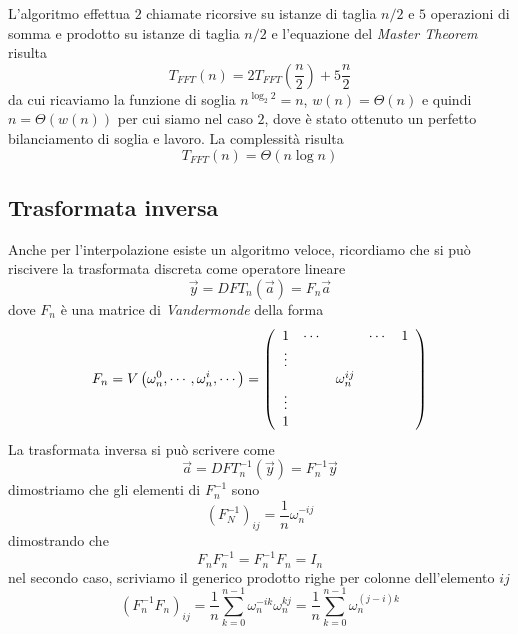 L'algoritmo effettua $2$ chiamate ricorsive su istanze di taglia $n/2$ e $5$ operazioni di somma e prodotto su istanze di taglia $n/2$ e l'equazione del \textit{Master Theorem} risulta
\begin{equation*}
    T_{FFT} (n) = 2 T_{FFT} \left( \frac{n}{2} \right) + 5 \frac{n}{2} %
\end{equation*}
da cui ricaviamo la funzione di soglia $n^{\log_2 2} = n$, $w(n)= \Theta \left( n \right)$ e quindi $n = \Theta \left( w\left( n \right) \right)$ per cui siamo nel caso $2$, dove è stato ottenuto un perfetto bilanciamento di soglia e lavoro. La complessità risulta
\begin{equation*}
    T_{FFT} (n) = \Theta \left( n \log n \right)
\end{equation*}

\subsection{Trasformata inversa}
Anche per l'interpolazione esiste un algoritmo veloce, ricordiamo che si può riscivere la trasformata discreta come operatore lineare 
$$\vec{y} = DFT_n \left( \vec{a} \right) = F_n \vec{a}$$
dove $F_n$ è una matrice di \textit{Vandermonde} della forma
\begin{equation*}
    F_n = V\left( \omega_n^0, \cdots, \omega_n^i, \cdots \right) =
    \left(
        \begin{array}[h]{ccccc}
            1 & \cdots & & \cdots & 1 \\
            \vdots \\
            & & \omega_n^{ij} \\
            \vdots \\
            1\\
        \end{array}
    \right)
\end{equation*}
La trasformata inversa si può scrivere come 
$$\vec{a} = DFT_n^{-1} \left( \vec{y} \right) = F_n^{-1}\vec{y}$$
dimostriamo che gli elementi di $F_n^{-1}$ sono 
\begin{equation*}
    \left( F_N^{-1} \right)_{ij} = \frac{1}{n} \omega_n^{-ij}
\end{equation*}
dimostrando che
\begin{equation*}
    F_n F_n^{-1} = F_n^{-1} F_n = I_n
\end{equation*}
nel secondo caso, scriviamo il generico prodotto righe per colonne dell'elemento $ij$
\begin{equation*}
    \left( F_n^{-1} F_n \right)_{ij} =
    \frac{1}{n} \sum_{k=0}^{n-1} \omega_n^{-ik} \omega_n^{kj} =
    \frac{1}{n} \sum_{k=0}^{n-1} \omega_n^{(j-i)k}
\end{equation*}
